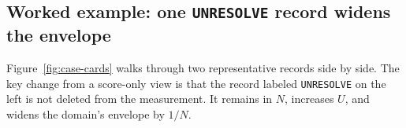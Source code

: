 \documentclass{article}
\begin{document}
\subsection{Worked example: one \texttt{UNRESOLVE} record widens the envelope}
\label{sec:worked-example}

Figure~\ref{fig:case-cards} walks through two representative records side by
side. The key change from a score-only view is that the record labeled
\texttt{UNRESOLVE} on the left is not deleted from the measurement. It remains
in \(N\), increases \(U\), and widens the domain's envelope by \(1/N\).

\begin{figure}[t]
\centering
\newcommand{\casefield}[2]{\noindent\textbf{#1}\quad #2\par\vspace{0.28em}}
\newcommand{\casecard}[3]{%
\begin{tikzpicture}[baseline=(card.north)]
\node[
  name=card,
  draw=#1!75,
  fill=#1!12,
  rounded corners=2pt,
  line width=0.6pt,
  inner sep=0pt,
  text width=0.465\textwidth
] {%
  \begin{minipage}{\linewidth}
  \setlength{\fboxsep}{3pt}
  \noindent\colorbox{#1!75}{%
    \parbox{\dimexpr\linewidth-2\fboxsep\relax}{%
      \textcolor{white}{\bfseries\footnotesize #2}}}%
  \vspace{0.35em}
  {\scriptsize\color{figline}#3}%
  \vspace{0.15em}
  \end{minipage}
};
\end{tikzpicture}%
}


\end{figure}
\end{document}
